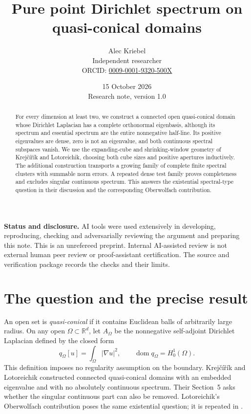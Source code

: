 \documentclass[11pt]{article}
\title{Pure point Dirichlet spectrum on quasi-conical domains}
\author{Alec Kriebel\\
  \small Independent researcher\\
  \small ORCID: \href{https://orcid.org/0009-0001-9320-500X}{0009-0001-9320-500X}}
\date{15 October 2026\\ \small Research note, version 1.0}
\newcommand{\R}{\mathbb R}
\newcommand{\dom}{\operatorname{dom}}
\begin{document}
\maketitle
\begin{abstract}
For every dimension at least two, we construct a connected open
quasi-conical domain whose Dirichlet Laplacian has a complete orthonormal
eigenbasis, although its spectrum and essential spectrum are the entire
nonnegative half-line. Its positive eigenvalues are dense, zero is not
an eigenvalue, and both continuous spectral subspaces vanish.
We use the expanding-cube and shrinking-window geometry of
Krej\v{c}\'i\v{r}\'ik and Lotoreichik, choosing both cube sizes and positive
apertures inductively. The additional construction transports a growing
family of complete finite spectral clusters with summable norm errors.
A repeated dense test family proves completeness and excludes singular
continuous spectrum. This answers the existential spectral-type question
in their discussion and the corresponding Oberwolfach contribution.
\end{abstract}

\noindent\textbf{Status and disclosure.}
AI tools were used extensively in developing, reproducing, checking and
adversarially reviewing the argument and preparing this note.
This is an unrefereed preprint. Internal AI-assisted review is not external
human peer review or proof-assistant certification.
The source and verification package records the checks and their limits.

\section{The question and the precise result}

An open set is \emph{quasi-conical} if it contains Euclidean balls of
arbitrarily large radius. On any open $\Omega\subset\R^d$, let $A_\Omega$
be the nonnegative self-adjoint Dirichlet Laplacian defined by the closed
form
\[
 q_\Omega[u]=\int_\Omega|\nabla u|^2,\qquad
 \dom q_\Omega=H_0^1(\Omega).
\]
This definition imposes no regularity assumption on the boundary.
Krej\v{c}\'i\v{r}\'ik and Lotoreichik \cite{KL} constructed connected
quasi-conical domains with an embedded eigenvalue and with no absolutely
continuous spectrum. Their Section~5 asks whether the singular continuous
part can also be removed. Lotoreichik's Oberwolfach contribution
\cite[pp.~2077--2078]{OWR} poses the same existential question; it is
repeated in \cite[Open Problem~1, PDF p.~16]{K26}.
\end{document}
